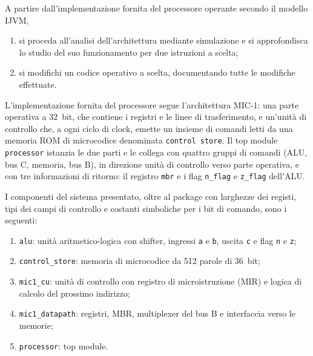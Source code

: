 \label{sec:esercizio9-1}

\begin{traccia}
A partire dall'implementazione fornita del processore operante secondo il modello IJVM,
\begin{enumerate}[label=\alph*)]
  \item si proceda all'analisi dell'architettura mediante simulazione e si approfondisca lo studio del suo funzionamento per due istruzioni a scelta;
  \item si modifichi un codice operativo a scelta, documentando tutte le modifiche effettuate.
\end{enumerate}
\end{traccia}




\progetto

L'implementazione fornita del processore segue l'architettura MIC-1: una parte operativa a \SI{32}{bit}, che contiene i registri e le linee di trasferimento, e un'unità di controllo che, a ogni ciclo di clock, emette un insieme di comandi letti da una memoria ROM di microcodice denominata \texttt{control store}. Il top module \texttt{processor} istanzia le due parti e le collega con quattro gruppi di comandi (ALU, bus C, memoria, bus B), in direzione unità di controllo verso parte operativa, e con tre informazioni di ritorno: il registro \texttt{mbr} e i flag \texttt{n\_flag} e \texttt{z\_flag} dell'ALU.

I componenti del sistema presentato, oltre al package con larghezze dei registi, tipi dei campi di controllo e costanti simboliche per i bit di comando, sono i seguenti:
\begin{enumerate}
  \item \texttt{alu}: unità aritmetico-logica con shifter, ingressi \texttt{a} e \texttt{b}, uscita \texttt{c} e flag \texttt{n} e \texttt{z};
  \item \texttt{control\_store}: memoria di microcodice da 512 parole di \SI{36}{bit};
  \item \texttt{mic1\_cu}: unità di controllo con registro di microistruzione (MIR) e logica di calcolo del prossimo indirizzo;
  \item \texttt{mic1\_datapath}: registri, MBR, multiplexer del bus B e interfaccia verso le memorie;
  \item \texttt{processor}: top module.
\end{enumerate}

